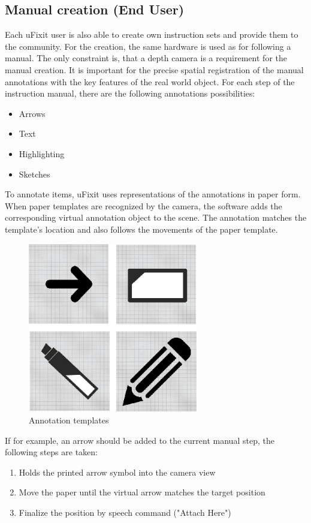 \subsection{Manual creation (End User)}
Each uFixit user is also able to create own instruction sets and provide them to the community. For the creation, the same hardware is used as for following a manual. The only constraint is, that a depth camera is a requirement for the manual creation. It is important for the precise spatial registration of the manual annotations with the key features of the real world object. For each step of the instruction manual, there are the following annotations possibilities:

\begin{itemize}
\item Arrows
\item Text
\item Highlighting
\item Sketches
\end{itemize}

To annotate items, uFixit uses representations of the annotations in paper form. When paper templates are recognized by the camera, the software adds the corresponding virtual annotation object to the scene. The annotation matches the template's location and also follows the movements of the paper template. 

\begin{figure}[H]
		\includegraphics[width=0.66\textwidth]{../images/paperMarker.png}
		\centering
		\caption{Annotation templates}
		\label{fig:cardBoard}
\end{figure}

If for example, an arrow should be added to the current manual step, the following steps are taken:
\begin{enumerate}
\item Holds the printed arrow symbol into the camera view
\item Move the paper until the virtual arrow matches the target position
\item Finalize the position by speech command ("Attach Here")
\end{enumerate}

